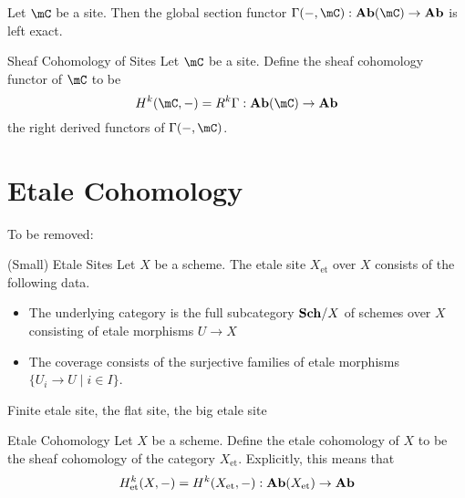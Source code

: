 \documentclass[a4paper]{article}
\begin{document}
\begin{prp}{}{} Let $\mC$ be a site. Then the global section functor $\Gamma(-,\mC):\bold{Ab}(\mC)\to\bold{Ab}$ is left exact. 
\end{prp}

\begin{defn}{Sheaf Cohomology of Sites}{} Let $\mC$ be a site. Define the sheaf cohomology functor of $\mC$ to be $$H^k(\mC,-)=R^k\Gamma:\bold{Ab}(\mC)\to\bold{Ab}$$ the right derived functors of $\Gamma(-,\mC)$. 
\end{defn}

\pagebreak
\section{Etale Cohomology}
To be removed: 

\begin{defn}{(Small) Etale Sites}{} Let $X$ be a scheme. The etale site $X_\text{et}$ over $X$ consists of the following data. 
\begin{itemize}
\item The underlying category is the full subcategory $\bold{Sch}/X$ of schemes over $X$ consisting of etale morphisms $U\to X$
\item The coverage consists of the surjective families of etale morphisms $\{U_i\to U\;|\;i\in I\}$. 
\end{itemize}
\end{defn}

Finite etale site, the flat site, the big etale site

\begin{defn}{Etale Cohomology}{} Let $X$ be a scheme. Define the etale cohomology of $X$ to be the sheaf cohomology of the category $X_\text{et}$. Explicitly, this means that $$H_\text{et}^k(X,-)=H^k(X_\text{et},-):\bold{Ab}(X_\text{et})\to\bold{Ab}$$
\end{defn}
\end{document}
